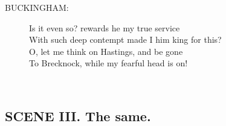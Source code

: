 \documentclass{article}
\begin{document}
\begin{description}
\item[BUCKINGHAM:] 
\hspace{1pt}Is it even so? rewards he my true service\\
\hspace{1pt}With such deep contempt made I him king for this?\\
\hspace{1pt}O, let me think on Hastings, and be gone\\
\hspace{1pt}To Brecknock, while my fearful head is on!\\
\end{description}
\centering{\it [Exit]}\\
\subsection*{SCENE III.  The same.}
\\
\end{document}
